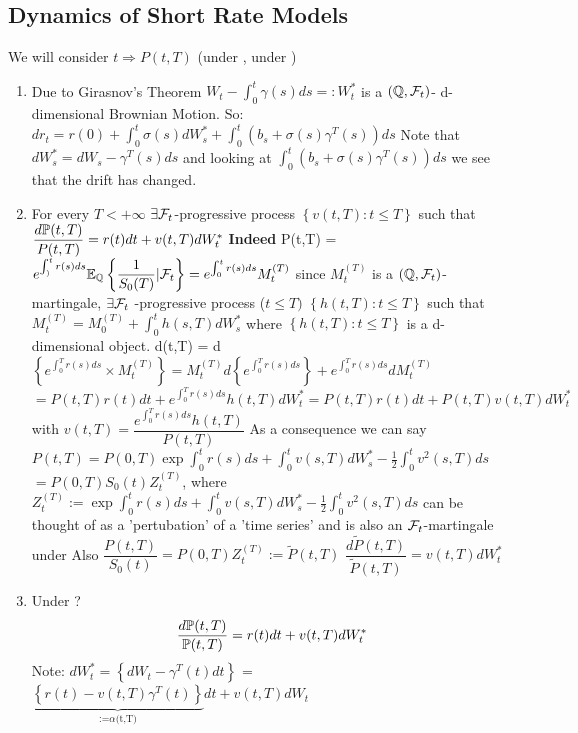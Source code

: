 \subsection{Dynamics of Short Rate Models}
We will consider $t \Rightarrow P(t,T)$ (under \Pbb, under \Qbb)
\begin{enumerate}
 \item Due to Girasnov's Theorem $W_t - \int_0^t \gamma(s) ds =: W_t^{*}$ is a 
$(\mathbb{Q}, \mathcal{F}_t)$- d-dimensional Brownian Motion. So: $dr_t = r(0) + \int_0^t \sigma(s) dW^{*}_s + 
\int_0^t (b_s + \sigma(s) \gamma^{T} (s)) ds$
\newline Note that $dW^{*}_s = dW_s - \gamma^{T}(s)ds$ and looking at 
$\int_0^t (b_s + \sigma(s) \gamma^{T} (s)) ds$ we see that the drift has changed.
\item For every $T \lt +\infty$ $\exists \mathcal{F}_t$-progressive process $\left\lbrace v(t,T): t \leq T \right\rbrace$ 
such that $\dfrac{d \mathbb{P}(t,T)}{P(t,T)} = r(t)dt + v(t,T) dW^*_t$
\newline 
\textbf{Indeed} P(t,T) = $e^{\int_{)}^{t}r(s)ds} \mathbb{E}_{\mathbb{Q}}\left\lbrace \dfrac{1}{S_{0}(T)}| \mathcal{F}_t
\right\rbrace = e^{\int_{0}^{t}r(s)ds}M_t^{(T)}$ since $M_t^{(T)}$ is a $(\mathbb{Q}, \mathcal{F}_t)$-martingale, $\exists \mathcal{F}_t$
-progressive process ($t \leq T)$ $\left\lbrace h(t,T): t \leq T\right\rbrace$ such that $M_t^{(T)} = M_0^{(T)} +
\int_{0}^{t} h(s,T)dW^*_s $
where $\left\lbrace h(t,T): t \leq T\right\rbrace$ is  a d-dimensional object.
\newline 
d\Pbb(t,T) = d $\left\lbrace e^{\int_{0}^{T}r(s)ds} \times M^{(T)}_t\right\rbrace = M^{(T)}_t d\left\lbrace
e^{\int_{0}^{T}r(s)ds} \right\rbrace + e^{\int_{0}^{T}r(s)ds} dM^{(T)}_{t}$
\begin{displaymath} =P(t,T) r(t)dt + e^{\int_{0}^{T}r(s)ds}
h(t,T) dW^*_t = P(t,T)r(t) dt + P(t,T) v(t,T) dW^*_{t} \end{displaymath}
with $v(t,T) = \dfrac{e^{\int_{0}^{T}r(s)ds}h(t,T)}{P(t,T)}$
\newline As a consequence we can say 
$P(t,T) = P(0,T)\exp{\int_0^t r(s) ds + \int_0^t v(s,T)dW^*_s - \frac{1}{2} \int_0^t v^{2} (s,T) ds}$
$= P(0,T) S_{0}(t) Z_{t}^{(T)}$, where 
$Z_{t}^{(T)}:=\exp{\int_0^t r(s) ds + \int_0^t v(s,T)dW^*_s - 
\frac{1}{2} \int_0^t v^{2} (s,T) ds}$ can be thought of as a 'pertubation' of a 'time series' 
and is also an $\mathcal{F}_t$-martingale under \Qbb
Also $\dfrac{P(t,T)}{S_{0}(t)} = P(0,T)Z_{t}^{(T)} := \tilde{P}(t,T)$
$\dfrac{d\tilde{P}(t,T)}{\tilde{P}(t,T)} = v(t,T) dW_t^{*}$
\item Under \Pbb? 
\begin{equation}
 \dfrac{d \mathbb{P}(t,T)}{\mathbb{P}(t,T)} = r(t)dt + v(t,T) dW_t^{*} 
\end{equation}
Note: $dW_t^{*} = \left\lbrace dW_t - \gamma^{T} (t) dt\right\rbrace$
= $\underbrace{\left\lbrace r(t) - v(t,T) \gamma^{T}(t) \right\rbrace}_{\text{:=$\alpha$(t,T)}} dt + v(t,T)dW_{t}$
\end{enumerate}
